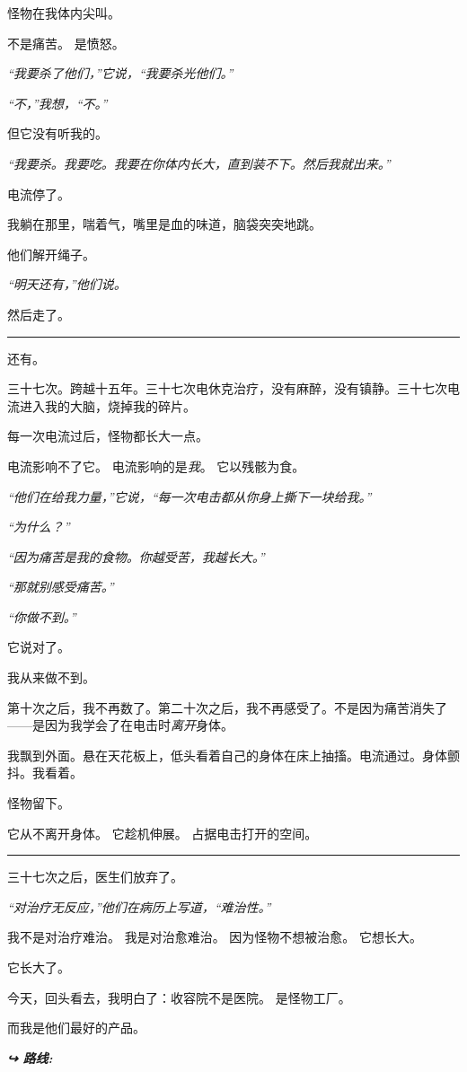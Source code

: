 \noindent 怪物在我体内尖叫。

\noindent 不是痛苦。
是愤怒。

\noindent \textit{“我要杀了他们，”它说，“我要杀光他们。”}

\noindent \textit{“不，”我想，“不。”}

\noindent 但它没有听我的。

\noindent \textit{“我要杀。我要吃。我要在你体内长大，直到装不下。然后我就出来。”}

\noindent 电流停了。

\noindent 我躺在那里，喘着气，嘴里是血的味道，脑袋突突地跳。

\noindent 他们解开绳子。

\noindent \textit{“明天还有，”他们说。}

\noindent 然后走了。

\vspace{0.5em}\noindent\rule{\textwidth}{0.5pt}\vspace{0.5em}

\noindent 还有。

\noindent 三十七次。跨越十五年。三十七次电休克治疗，没有麻醉，没有镇静。三十七次电流进入我的大脑，烧掉我的碎片。

\noindent 每一次电流过后，怪物都长大一点。

\noindent 电流影响不了它。
电流影响的是\textit{我}。
它以残骸为食。

\noindent \textit{“他们在给我力量，”它说，“每一次电击都从你身上撕下一块给我。”}

\noindent \textit{“为什么？”}

\noindent \textit{“因为痛苦是我的食物。你越受苦，我越长大。”}

\noindent \textit{“那就别感受痛苦。”}

\noindent \textit{“你做不到。”}

\noindent 它说对了。

\noindent 我从来做不到。

\noindent 第十次之后，我不再数了。第二十次之后，我不再感受了。不是因为痛苦消失了——是因为我学会了在电击时\textit{离开}身体。

\noindent 我飘到外面。悬在天花板上，低头看着自己的身体在床上抽搐。电流通过。身体颤抖。我看着。

\noindent 怪物留下。

\noindent 它从不离开身体。
它趁机伸展。
占据电击打开的空间。

\vspace{0.5em}\noindent\rule{\textwidth}{0.5pt}\vspace{0.5em}

\noindent 三十七次之后，医生们放弃了。

\noindent \textit{“对治疗无反应，”他们在病历上写道，“难治性。”}

\noindent 我不是对治疗难治。
我是对治愈难治。
因为怪物不想被治愈。
它想长大。

\noindent 它长大了。

\noindent 今天，回头看去，我明白了：收容院不是医院。
是怪物工厂。

\noindent 而我是他们最好的产品。

\vspace{0.5em}
\noindent\textit{\textbf{↪ 路线:}  \rotasep {} \rotasep {}}
